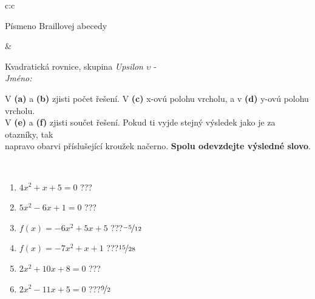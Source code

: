 \documentclass[10pt]{report}
\begin{document}
\begin{tabular}{c:c}
\begin{minipage}[c][104.5mm][t]{0.5\linewidth}
\begin{center}
\begin{minipage}{0.20\linewidth}
\begin{center}
{\small Písmeno Braillovej abecedy}
\end{center}
\end{minipage}
\end{center}
\end{minipage}
&
\begin{minipage}[c][104.5mm][t]{0.5\linewidth}
\begin{center}
\vspace{7mm}
{\huge Kvadratická rovnice, skupina \textit{Upsilon $\upsilon$} -}\\[5mm]
\textit{Jméno:}\phantom{xxxxxxxxxxxxxxxxxxxxxxxxxxxxxxxxxxxxxxxxxxxxxxxxxxxxxxxxxxxxxxxxx}\\[5mm]
\begin{minipage}{0.95\linewidth}
\begin{center}
V \textbf{(a)} a \textbf{(b)} zjisti počet řešení. V \textbf{(c)} x-ovú polohu vrcholu, a v \textbf{(d)} y-ovú polohu vrcholu.\\V \textbf{(e)} a \textbf{(f)} zjisti součet řešení. Pokud ti vyjde stejný výsledek jako je za otazníky, tak\\napravo obarvi příslušející kroužek načerno. \textbf{Spolu odevzdejte výsledné slovo}.
\end{center}
\end{minipage}
\\[1mm]
\begin{minipage}{0.79\linewidth}
\begin{center}
\begin{varwidth}{\linewidth}
\begin{enumerate}
\Large
\item $4x^2+x+5=0$\quad \dotfill\; ???\;\dotfill {}
\item $5x^2-6x+1=0$\quad \dotfill\; ???\;\dotfill {}
\item $f(x)=-6x^2+5x+5$\quad \dotfill\; ???\;\dotfill \quad $\nicefrac{-5}{12}$
\item $f(x)=-7x^2+x+1$\quad \dotfill\; ???\;\dotfill \quad $\nicefrac{15}{28}$
\item $2x^2+10x+8=0$\quad \dotfill\; ???\;\dotfill {}
\item $2x^2-11x+5=0$\quad \dotfill\; ???\;\dotfill \quad $\nicefrac{9}{2}$
\end{enumerate}
\end{varwidth}
\end{center}
\end{minipage}
\begin{minipage}{0.20\linewidth}

\end{minipage}
\end{center}
\end{minipage}
\end{tabular}
\end{document}
